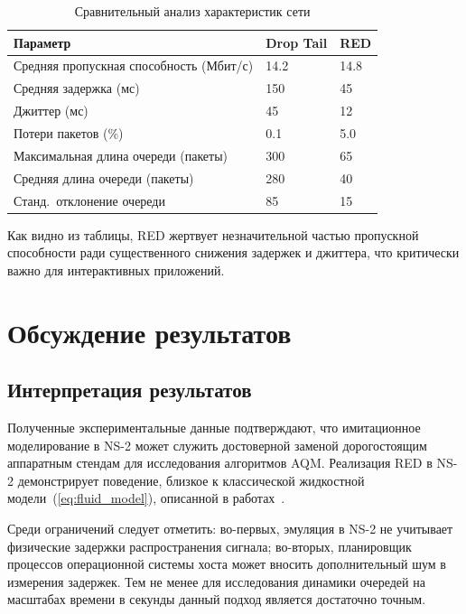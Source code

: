 \documentclass[%
]{ittmm}
\begin{document}
\begin{table}[htbp]
  \centering
  \small
  \caption{Сравнительный анализ характеристик сети}
  \label{tab:results}
  \begin{tabularx}{\linewidth}{|>{\raggedright\arraybackslash}X|X|X|}
    \hline
    \textbf{Параметр} & \textbf{Drop Tail} & \textbf{RED} \\ \hline
    Средняя пропускная способность (Мбит/с) & 14.2 & 14.8 \\ \hline
    Средняя задержка (мс) & 150 & 45 \\ \hline
    Джиттер (мс) & 45 & 12 \\ \hline
    Потери пакетов (\%) & 0.1 & 5.0 \\ \hline
    Максимальная длина очереди (пакеты) & 300 & 65 \\ \hline
    Средняя длина очереди (пакеты) & 280 & 40 \\ \hline
    Станд.\ отклонение очереди & 85 & 15 \\ \hline
  \end{tabularx}
\end{table}

Как видно из таблицы, RED жертвует незначительной частью пропускной способности ради существенного снижения задержек и джиттера, что критически важно для интерактивных приложений.

\section{Обсуждение результатов}

\subsection{Интерпретация результатов}

Полученные экспериментальные данные подтверждают, что имитационное моделирование в NS-2 может служить достоверной заменой дорогостоящим аппаратным стендам для исследования алгоритмов AQM. Реализация RED в NS-2 демонстрирует поведение, близкое к классической жидкостной модели~(\ref{eq:fluid_model}), описанной в работах~\cite{korolkova2010phd}.

Среди ограничений следует отметить: во-первых, эмуляция в NS-2 не учитывает физические задержки распространения сигнала; во-вторых, планировщик процессов операционной системы хоста может вносить дополнительный шум в измерения задержек. Тем не менее для исследования динамики очередей на масштабах времени в секунды данный подход является достаточно точным.
\end{document}
